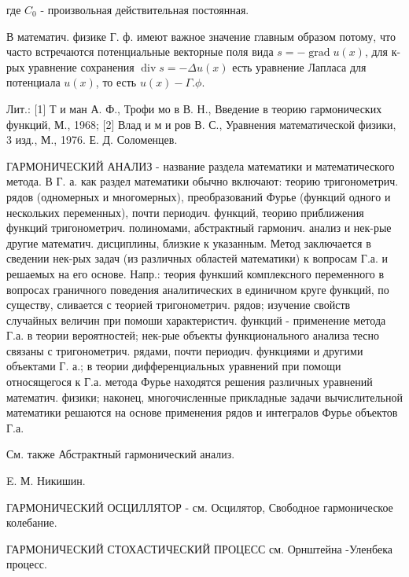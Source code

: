 \documentclass[10pt]{article}
\begin{document}
где $C_{0}$ - произвольная действительная постоянная.



В математич. физике Г. ф. имеют важное значение главным образом потому, что часто встречаются потенциальные векторные поля вида $s=-\operatorname{grad} u(x)$, для к-рых уравнение сохранения $\operatorname{div} s=-\Delta u(x)$ есть уравнение Лапласа для потенциала $u(x)$, то есть $u(x)-\Gamma . \phi$.



Лит.: [1] Т и ман А. Ф., Трофи мо в В. Н., Введение в теорию гармонических функций, М., 1968; [2] Влад и м и ров В. С., Уравнения математической физики, 3 изд., М., 1976. Е. Д. Соломенцев.



ГАРМОНИЧЕСКИЙ АНАЛИЗ - название раздела математики и математического метода. В Г. а. как раздел математики обычно включают: теорию тригонометрич. рядов (одномерных и многомерных), преобразований Фурье (функций одного и нескольких переменных), почти периодич. функций, теорию приближения функций тригонометрич. полиномами, абстрактный гармонич. анализ и нек-рые другие математич. дисциплины, близкие к указанным. Метод заключается в сведении нек-рых задач (из различных областей математики) к вопросам Г.а. и решаемых на его основе. Напр.: теория функший комплексного переменного в вопросах граничного поведения аналитических в единичном круге функций, по существу, сливается с теорией тригонометрич. рядов; изучение свойств случайных величин при помоши характеристич. функций - применение метода Г.а. в теории вероятностей; нек-рые объекты функционального анализа тесно связаны с тригонометрич. рядами, почти периодич. функциями и другими объектами Г. а.; в теории дифференциальных уравнений при помощи относящегося к Г.а. метода Фурье находятся решения различных уравнений математич. физики; наконец, многочисленные прикладные задачи вычислительной математики решаются на основе применения рядов и интегралов Фурье объектов Г.а.



См. также Абстрактный гармонический анализ.



E. М. Никишин.



ГАРМОНИЧЕСКИЙ ОСЦИЛЛЯТОР - см. Осцилятор, Свободное гармоническое колебание.



ГАРМОНИЧЕСКИЙ СТОХАСТИЧЕСКИЙ ПРОЦЕСС см. Орнштейна -Уленбека процесс.
\end{document}
